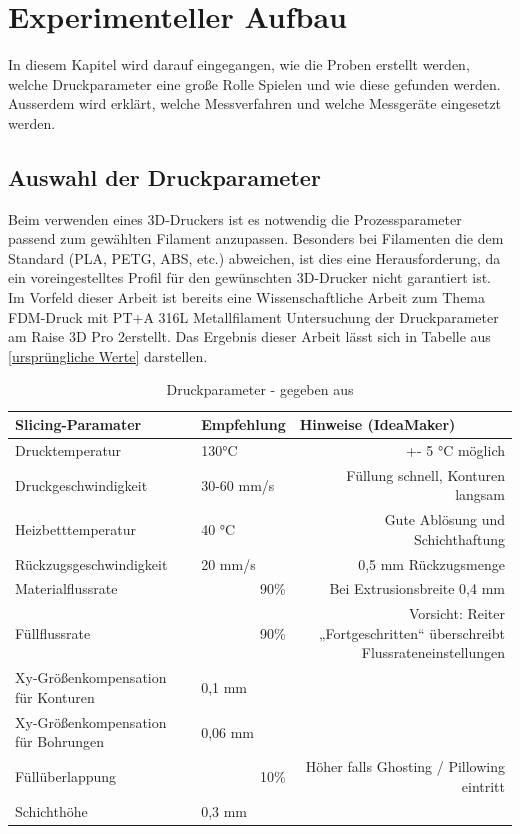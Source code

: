 \chapter{Experimenteller Aufbau}

In diesem Kapitel wird darauf eingegangen, wie die Proben erstellt werden, welche Druckparameter eine große Rolle Spielen und wie diese gefunden werden. Ausserdem wird erklärt, welche Messverfahren und welche Messgeräte eingesetzt werden.\\


\section{Auswahl der Druckparameter}

Beim verwenden eines 3D-Druckers ist es notwendig die Prozessparameter passend zum gewählten Filament anzupassen. Besonders bei Filamenten die dem Standard (PLA, PETG, ABS, etc.) abweichen, ist dies eine Herausforderung, da ein voreingestelltes Profil für den gewünschten 3D-Drucker nicht garantiert ist. Im Vorfeld dieser Arbeit ist bereits eine Wissenschaftliche Arbeit zum Thema \glqq FDM-Druck mit PT+A 316L Metallfilament Untersuchung der Druckparameter am Raise 3D Pro 2\grqq erstellt. Das Ergebnis dieser Arbeit lässt sich in Tabelle aus \autoref{ursprüngliche Werte} darstellen.

\begin{table}[htbp]
    \centering
    \caption{Druckparameter - gegeben aus \autocite{M.Mickan}}
      \begin{tabular}{llr}
      \toprule
      \textbf{Slicing-Paramater} & \textbf{Empfehlung} & \multicolumn{1}{l|}{\textbf{Hinweise (IdeaMaker)}} \\
      \midrule
      Drucktemperatur & 130°C & \multicolumn{1}{p{12.555em}}{+- 5 °C möglich} \\
      Druckgeschwindigkeit & 30-60 mm/s & \multicolumn{1}{p{12.555em}}{Füllung schnell, Konturen langsam} \\
      Heizbetttemperatur & 40 °C & \multicolumn{1}{p{12.555em}}{Gute Ablösung und Schichthaftung} \\
      Rückzugsgeschwindigkeit & 20 mm/s & \multicolumn{1}{p{12.555em}}{0,5 mm Rückzugsmenge} \\
      Materialflussrate & \multicolumn{1}{r}{90\%} & \multicolumn{1}{p{12.555em}}{Bei Extrusionsbreite 0,4 mm} \\
      Füllflussrate & \multicolumn{1}{r}{90\%} & \multicolumn{1}{p{12.555em}}{Vorsicht: Reiter „Fortgeschritten“ überschreibt Flussrateneinstellungen} \\
      Xy-Größenkompensation für Konturen & 0,1 mm &  \\
      Xy-Größenkompensation für Bohrungen & 0,06 mm &  \\
      Füllüberlappung & \multicolumn{1}{r}{10\%} & \multicolumn{1}{p{12.555em}}{Höher falls Ghosting / Pillowing eintritt} \\
      Schichthöhe & 0,3 mm &  \\
      \bottomrule
      \end{tabular}%
    \label{ursprüngliche Werte}%
  \end{table}%
  
